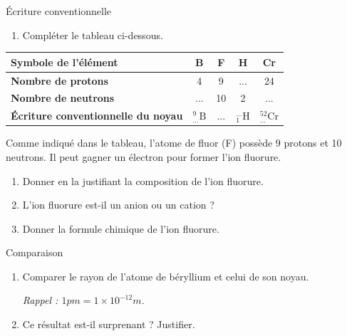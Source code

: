 \documentclass[12pt,a4paper]{article}
\renewcommand\arraystretch{1.25}		%
\begin{document}
\begin{exo}{Écriture conventionnelle}


\begin{enumerate}
\item \app{} 

Compléter le tableau ci-dessous.
\end{enumerate}

\begin{center}
\renewcommand\arraystretch{2}		%
\begin{tabular}{|l|c|c|c|c|}
\hline
\textbf{Symbole de l'élément}	& \quad{} B \quad{} & \quad{} F \quad{} & \quad{} H \quad{} & \quad{} Cr \quad{} \\
\hline
\textbf{Nombre de protons}		& 4 & 9 & ... & 24 \\
\hline
\textbf{Nombre de neutrons}	& ... & 10 & 2 & ... \\
\hline
\textbf{Écriture conventionnelle du noyau} & $^{9}_{...}\text{B}$ & ... & $^{...}_{1}\text{H}$ & $^{52}_{...}\text{Cr}$ \\
\hline
\end{tabular}
\renewcommand\arraystretch{1.5}		%
\end{center}

Comme indiqué dans le tableau, l'atome de fluor (F) possède 9 protons et 10 neutrons.
Il peut gagner un électron pour former l'ion fluorure.

\begin{enumerate}[resume]
\item \anarai{} 

Donner en la justifiant la composition de l'ion fluorure.

\item \anarai{} 

L'ion fluorure est-il un anion ou un cation ?

\item \rea{} 

Donner la formule chimique de l'ion fluorure.
\end{enumerate}
\end{exo}

\begin{exo}{Comparaison}
\begin{enumerate}
\item \rea{} 

Comparer le rayon de l'atome de béryllium et celui de son noyau.

\emph{Rappel : $\unit{1}{pm} = \unit{1\times 10^{-12}}{m}$.}

\item \val{} 

Ce résultat est-il surprenant ?
Justifier.
\end{enumerate}

\end{exo}

\vfill
\makecptces
\end{document}
